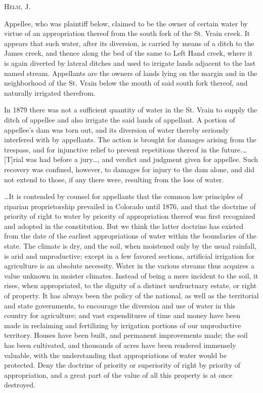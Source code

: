 

\textsc{Helm, J}.

Appellee, who was plaintiff below, claimed to be the owner of certain water by
virtue of an appropriation thereof from the south fork of the St. Vrain creek.
It appears that such water, after its diversion, is carried by means of a ditch
to the James creek, and thence along the bed of the same to Left Hand creek,
where it is again diverted by lateral ditches and used to irrigate lands
adjacent to the last named stream. Appellants are the owners of lands lying on
the margin and in the neighborhood of the St. Vrain below the mouth of said
south fork thereof, and naturally irrigated therefrom.

In 1879 there was not a sufficient quantity of water in the St. Vrain to supply
the ditch of appellee and also irrigate the said lands of appellant. A portion
of appellee's dam was torn out, and its diversion of water thereby seriously
interfered with by appellants. The action is brought for damages arising from
the trespass, and for injunctive relief to prevent repetitions thereof in the
future.\ldots [T]rial was had before a jury\ldots , and verdict and judgment
given for appellee. Such recovery was confined, however, to damages for injury
to the dam alone, and did not extend to those, if any there were, resulting from
the loss of water.

\ldots It is contended by counsel for appellants that the common law principles
of riparian proprietorship prevailed in Colorado until 1876, and that the
doctrine of priority of right to water by priority of appropriation thereof was
first recognized and adopted in the constitution. But we think the latter
doctrine has existed from the date of the earliest appropriations of water
within the boundaries of the state. The climate is dry, and the soil, when
moistened only by the usual rainfall, is arid and unproductive; except in a few
favored sections, artificial irrigation for agriculture is an absolute
necessity. Water in the various streams thus acquires a value unknown in moister
climates. Instead of being a mere incident to the soil, it rises, when
appropriated, to the dignity of a distinct usufructuary estate, or right of
property. It has always been the policy of the national, as well as the
territorial and state governments, to encourage the diversion and use of water
in this country for agriculture; and vast expenditures of time and money have
been made in reclaiming and fertilizing by irrigation portions of our
unproductive territory. Houses have been built, and permanent improvements made;
the soil has been cultivated, and thousands of acres have been rendered
immensely valuable, with the understanding that appropriations of water would be
protected. Deny the doctrine of priority or superiority of right by priority of
appropriation, and a great part of the value of all this property is at once
destroyed.

